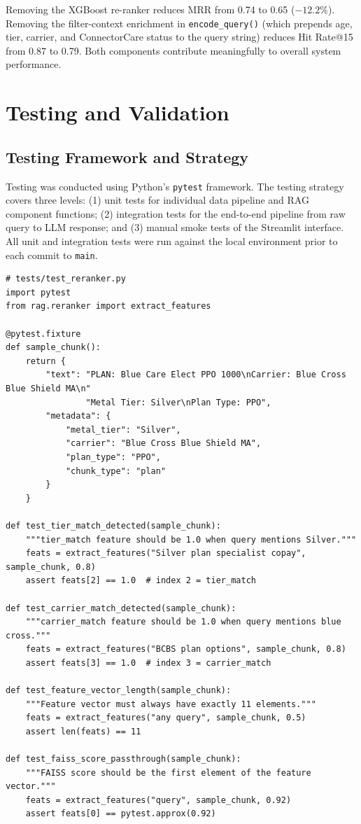 \documentclass[12pt, letterpaper]{article}
\begin{document}
Removing the XGBoost re-ranker reduces MRR from 0.74 to 0.65 ($-12.2\%$). Removing the filter-context enrichment in \texttt{encode\_query()} (which prepends age, tier, carrier, and ConnectorCare status to the query string) reduces Hit Rate@15 from 0.87 to 0.79. Both components contribute meaningfully to overall system performance.

\section{Testing and Validation}
\label{sec:testing}

\subsection{Testing Framework and Strategy}

Testing was conducted using Python's \texttt{pytest} framework. The testing strategy covers three levels: (1) unit tests for individual data pipeline and RAG component functions; (2) integration tests for the end-to-end pipeline from raw query to LLM response; and (3) manual smoke tests of the Streamlit interface. All unit and integration tests were run against the local environment prior to each commit to \texttt{main}.

\begin{lstlisting}[caption={Example pytest unit test for the re-ranker feature extractor}, label=lst:test_example]
# tests/test_reranker.py
import pytest
from rag.reranker import extract_features

@pytest.fixture
def sample_chunk():
    return {
        "text": "PLAN: Blue Care Elect PPO 1000\nCarrier: Blue Cross Blue Shield MA\n"
                "Metal Tier: Silver\nPlan Type: PPO",
        "metadata": {
            "metal_tier": "Silver",
            "carrier": "Blue Cross Blue Shield MA",
            "plan_type": "PPO",
            "chunk_type": "plan"
        }
    }

def test_tier_match_detected(sample_chunk):
    """tier_match feature should be 1.0 when query mentions Silver."""
    feats = extract_features("Silver plan specialist copay", sample_chunk, 0.8)
    assert feats[2] == 1.0  # index 2 = tier_match

def test_carrier_match_detected(sample_chunk):
    """carrier_match feature should be 1.0 when query mentions blue cross."""
    feats = extract_features("BCBS plan options", sample_chunk, 0.8)
    assert feats[3] == 1.0  # index 3 = carrier_match

def test_feature_vector_length(sample_chunk):
    """Feature vector must always have exactly 11 elements."""
    feats = extract_features("any query", sample_chunk, 0.5)
    assert len(feats) == 11

def test_faiss_score_passthrough(sample_chunk):
    """FAISS score should be the first element of the feature vector."""
    feats = extract_features("query", sample_chunk, 0.92)
    assert feats[0] == pytest.approx(0.92)
\end{lstlisting}
\end{document}

